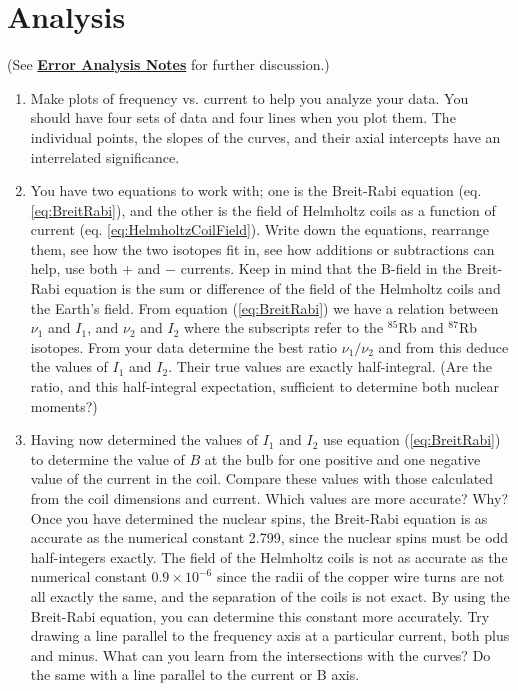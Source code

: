 \documentclass{../lab}
\begin{document}
\section{Analysis}

(See \href{\ErrorAnalysisNotes}{\textbf{Error Analysis Notes}} for further discussion.)

\begin{enumerate}
    \item Make plots of frequency vs. current to help you analyze your data. You should have four sets of data and four lines when you plot them. The individual points, the slopes of the curves, and their axial intercepts have an interrelated significance.

    \item You have two equations to work with; one is the Breit-Rabi equation (eq. \ref{eq:BreitRabi}), and the other is the field of Helmholtz coils as a function of current (eq. \ref{eq:HelmholtzCoilField}). Write down the equations, rearrange them, see how the two isotopes fit in, see how additions or subtractions can help, use both + and $-$ currents. Keep in mind that the B-field in the Breit-Rabi equation is the sum or difference of the field of the Helmholtz coils and the Earth's field. From equation (\ref{eq:BreitRabi}) we have a relation between $\nu_1$ and $I_1$, and $\nu_2$ and $I_2$ where the subscripts refer to the $^{85}$Rb and $^{87}$Rb isotopes. From your data determine the best ratio $\nu_1 / \nu_2$ and from this deduce the values of $I_1$ and $I_2$. Their true values are exactly half-integral. (Are the ratio, and this half-integral expectation, sufficient to determine both nuclear moments?)

    \item Having now determined the values of $I_1$ and $I_2$ use equation (\ref{eq:BreitRabi}) to determine the value of $B$ at the bulb for one positive and one negative value of the current in the coil. Compare these values with those calculated from the coil dimensions and current. Which values are more accurate? Why? Once you have determined the nuclear spins, the Breit-Rabi equation is as accurate as the numerical constant 2.799, since the nuclear spins must be odd half-integers exactly. The field of the Helmholtz coils is not as accurate as the numerical constant $0.9 \times 10^{-6}$ since the radii of the copper wire turns are not all exactly the same, and the separation of the coils is not exact. By using the Breit-Rabi equation, you can determine this constant more accurately. Try drawing a line parallel to the frequency axis at a particular current, both plus and minus. What can you learn from the intersections with the curves? Do the same with a line parallel to the current or B axis.


\end{enumerate}
\end{document}
